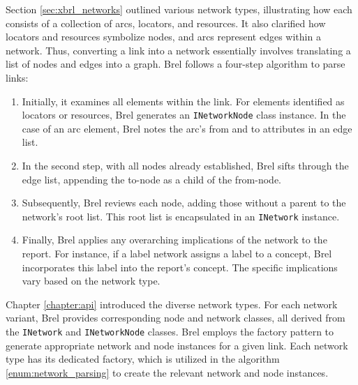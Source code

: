 Section \ref{sec:xbrl_networks} outlined various network types, illustrating how each consists of a collection of arcs, locators, and resources.
It also clarified how locators and resources symbolize nodes, and arcs represent edges within a network.
Thus, converting a link into a network essentially involves translating a list of nodes and edges into a graph.
Brel follows a four-step algorithm to parse links:

\begin{enumerate}\label{enum:network_parsing}
    \item Initially, it examines all elements within the link. 
    For elements identified as locators or resources, Brel generates an \texttt{INetworkNode} class instance.
    In the case of an arc element, Brel notes the arc's from and to attributes in an edge list.
    \item In the second step, with all nodes already established, Brel sifts through the edge list, appending the to-node as a child of the from-node.
    \item Subsequently, Brel reviews each node, adding those without a parent to the network's root list. This root list is encapsulated in an \texttt{INetwork} instance.
    \item Finally, Brel applies any overarching implications of the network to the report.
    For instance, if a label network assigns a label to a concept, Brel incorporates this label into the report's concept.
    The specific implications vary based on the network type.
\end{enumerate}

Chapter \ref{chapter:api} introduced the diverse network types.
For each network variant, Brel provides corresponding node and network classes, all derived from the \texttt{INetwork} and \texttt{INetworkNode} classes.
Brel employs the factory pattern to generate appropriate network and node instances for a given link.
Each network type has its dedicated factory, which is utilized in the algorithm \ref{enum:network_parsing} to create the relevant network and node instances.




